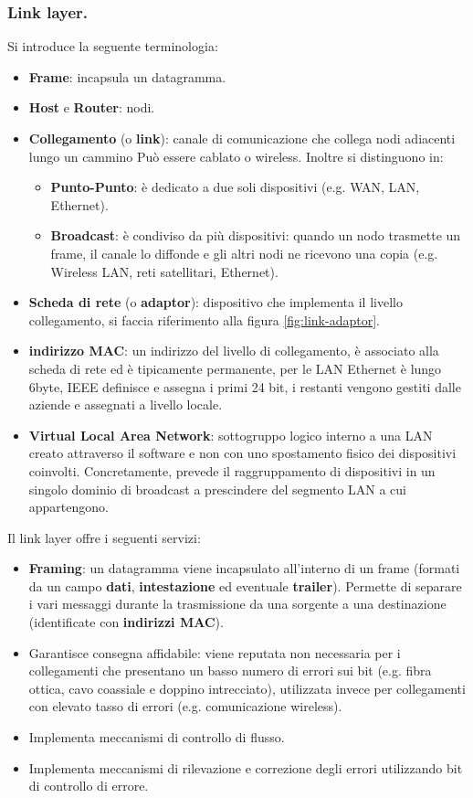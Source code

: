 \documentclass[11pt, italian, openany]{book}
\begin{document}
\begin{sloppypar}
\subsubsection{Link layer.}
Si introduce la seguente terminologia:
\begin{itemize}[itemsep=0pt,topsep=0pt,parsep=0pt]
	\item \textbf{Frame}: incapsula un datagramma.
	\item \textbf{Host} e \textbf{Router}: nodi.
	\item \textbf{Collegamento} (o \textbf{link}): canale di comunicazione che collega nodi adiacenti lungo un cammino Pu\`o essere cablato o wireless.
	Inoltre si distinguono in:
	\begin{itemize}
		\item \textbf{Punto-Punto}: \`e dedicato a due soli dispositivi (e.g. WAN, LAN, Ethernet).
		\item \textbf{Broadcast}: \`e condiviso da pi\`u dispositivi: quando un nodo trasmette un frame, il canale lo diffonde e gli altri nodi ne
		ricevono una copia (e.g. Wireless LAN, reti satellitari, Ethernet).
	\end{itemize}
	\item \textbf{Scheda di rete} (o \textbf{adaptor}): dispositivo che implementa il livello collegamento, si faccia riferimento alla figura
	\ref{fig:link-adaptor}.
	\item \textbf{indirizzo MAC}: un indirizzo del livello di collegamento, \`e associato alla scheda di rete ed \`e tipicamente permanente, per le
	LAN Ethernet \`e lungo 6byte, IEEE definisce e assegna i primi 24 bit, i restanti vengono gestiti dalle aziende e assegnati a livello locale.
	\item \textbf{Virtual Local Area Network}: sottogruppo logico interno a una LAN creato attraverso il software e non con uno spostamento fisico
	dei dispositivi coinvolti. Concretamente, prevede il raggruppamento di dispositivi in un singolo dominio di broadcast a prescindere del segmento LAN
	a cui appartengono.
\end{itemize}

Il link layer offre i seguenti servizi:
\begin{itemize}[itemsep=0pt,topsep=0pt,parsep=0pt]
	\item \textbf{Framing}: un datagramma viene incapsulato all'interno di un frame (formati da un campo \textbf{dati}, \textbf{intestazione} ed eventuale
	\textbf{trailer}). Permette di separare i vari messaggi durante la trasmissione da una sorgente a una destinazione (identificate con
	\textbf{indirizzi MAC}).
	\item Garantisce consegna affidabile: viene reputata non necessaria per i collegamenti che presentano un basso numero di errori sui bit (e.g. fibra ottica,
	cavo coassiale e doppino intrecciato), utilizzata invece per collegamenti con elevato tasso di errori (e.g. comunicazione wireless).
	\item Implementa meccanismi di controllo di flusso.
	\item Implementa meccanismi di rilevazione e correzione degli errori utilizzando bit di controllo di errore.
\end{itemize}


\end{sloppypar}
\end{document}
